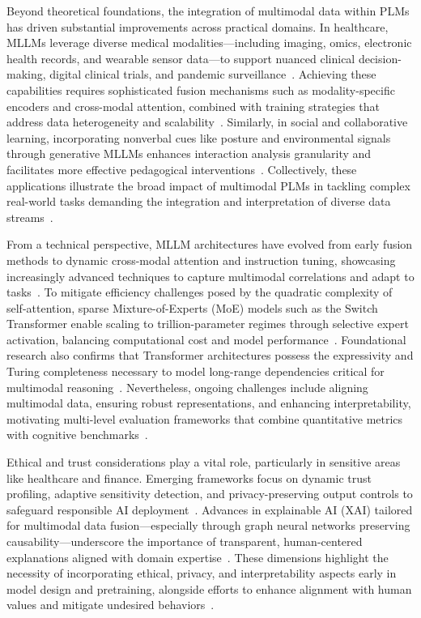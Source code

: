 \documentclass[sigconf]{acmart}
\begin{document}
Beyond theoretical foundations, the integration of multimodal data within PLMs has driven substantial improvements across practical domains. In healthcare, MLLMs leverage diverse medical modalities—including imaging, omics, electronic health records, and wearable sensor data—to support nuanced clinical decision-making, digital clinical trials, and pandemic surveillance~\cite{ref21}. Achieving these capabilities requires sophisticated fusion mechanisms such as modality-specific encoders and cross-modal attention, combined with training strategies that address data heterogeneity and scalability~\cite{ref23}. Similarly, in social and collaborative learning, incorporating nonverbal cues like posture and environmental signals through generative MLLMs enhances interaction analysis granularity and facilitates more effective pedagogical interventions~\cite{ref12}. Collectively, these applications illustrate the broad impact of multimodal PLMs in tackling complex real-world tasks demanding the integration and interpretation of diverse data streams~\cite{ref28}.

From a technical perspective, MLLM architectures have evolved from early fusion methods to dynamic cross-modal attention and instruction tuning, showcasing increasingly advanced techniques to capture multimodal correlations and adapt to tasks~\cite{ref14}. To mitigate efficiency challenges posed by the quadratic complexity of self-attention, sparse Mixture-of-Experts (MoE) models such as the Switch Transformer enable scaling to trillion-parameter regimes through selective expert activation, balancing computational cost and model performance~\cite{ref29}. Foundational research also confirms that Transformer architectures possess the expressivity and Turing completeness necessary to model long-range dependencies critical for multimodal reasoning~\cite{ref15}. Nevertheless, ongoing challenges include aligning multimodal data, ensuring robust representations, and enhancing interpretability, motivating multi-level evaluation frameworks that combine quantitative metrics with cognitive benchmarks~\cite{ref33}.

Ethical and trust considerations play a vital role, particularly in sensitive areas like healthcare and finance. Emerging frameworks focus on dynamic trust profiling, adaptive sensitivity detection, and privacy-preserving output controls to safeguard responsible AI deployment~\cite{ref22}. Advances in explainable AI (XAI) tailored for multimodal data fusion—especially through graph neural networks preserving causability—underscore the importance of transparent, human-centered explanations aligned with domain expertise~\cite{ref26}. These dimensions highlight the necessity of incorporating ethical, privacy, and interpretability aspects early in model design and pretraining, alongside efforts to enhance alignment with human values and mitigate undesired behaviors~\cite{ref27}.
\end{document}
